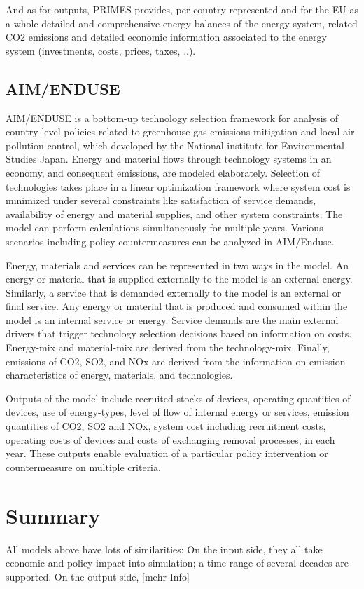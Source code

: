 \documentclass[lettersize,journal]{IEEEtran}
\begin{document}
  And as for outputs, PRIMES provides, per country represented and for the EU as a whole detailed and comprehensive energy balances of the energy system, related CO2 emissions and detailed economic information associated to the energy system (investments, costs, prices, taxes, ..).\cite{primes}

  \subsection{AIM/ENDUSE}
  AIM/ENDUSE  is a bottom-up technology selection framework for analysis of country-level policies related to greenhouse gas emissions mitigation and local air pollution control, which developed by the National institute for Environmental Studies Japan. Energy and material flows through technology systems in an economy, and consequent emissions, are modeled elaborately. Selection of technologies takes place in a linear optimization framework where system cost is minimized under several constraints like satisfaction of service demands, availability of energy and material supplies, and other system constraints.  The model can perform calculations simultaneously for multiple years. Various scenarios including policy countermeasures can be analyzed in AIM/Enduse. 

  Energy, materials and services can be represented in two ways in the model. An energy or material that is supplied externally to the model is an external energy. Similarly, a service that is demanded externally to the model is an external or final service. Any energy or material that is produced and consumed within the model is an internal service or energy. Service demands are the main external drivers that trigger technology selection decisions based on information on costs. Energy-mix and material-mix are derived from the technology-mix. Finally, emissions of CO2, SO2, and NOx are derived from the information on emission characteristics of energy, materials, and technologies. 

  Outputs of the model include recruited stocks of devices, operating quantities of devices, use of energy-types, level of flow of internal energy or services, emission quantities of CO2, SO2 and NOx, system cost including recruitment costs, operating costs of devices and costs of exchanging removal processes, in each year. These outputs enable evaluation of a particular policy intervention or countermeasure on multiple criteria.\cite{aim}



\section{Summary}
All models above have lots of similarities: On the input side, they all take economic and policy impact into simulation; a time range of several decades are supported. On the output side, 
[mehr Info]
\end{document}
